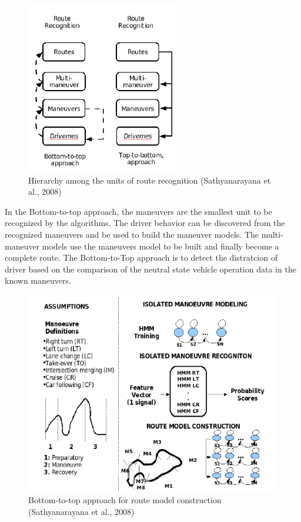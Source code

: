 \begin{figure}[hbt!]\centering
\includegraphics[width=.75\textwidth]{image/HMM_flowchart}
\caption{Hierarchy among the units of route recognition (Sathyanarayana et al., 2008)}
\end{figure}

In the Bottom-to-top approach, the maneuvers are the smallest unit to be recognized by the algorithms. The driver behavior can be discovered from the recognized maneuvers and be used to build the maneuver models. The multi-maneuver models use the maneuvers model to be built and finally become a complete route. The Bottom-to-Top approach is to detect the distratcion of driver based on the comparison of the neutral state vehicle operation data in the known maneuvers.

\begin{figure}[hbt!]\centering
\includegraphics[width=.75\textwidth]{image/BottomtoTop}
\caption{Bottom-to-top approach for route model construction (Sathyanarayana et al., 2008)}
\end{figure}

